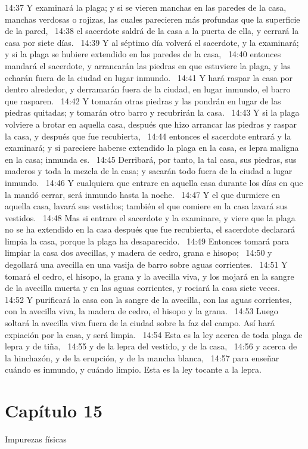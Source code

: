14:37 Y examinará la plaga; y si se vieren manchas en las paredes de la casa, manchas verdosas o rojizas, las cuales parecieren más profundas que la superficie de la pared,  
14:38 el sacerdote saldrá de la casa a la puerta de ella, y cerrará la casa por siete días.  
14:39 Y al séptimo día volverá el sacerdote, y la examinará; y si la plaga se hubiere extendido en las paredes de la casa,  
14:40 entonces mandará el sacerdote, y arrancarán las piedras en que estuviere la plaga, y las echarán fuera de la ciudad en lugar inmundo.  
14:41 Y hará raspar la casa por dentro alrededor, y derramarán fuera de la ciudad, en lugar inmundo, el barro que rasparen.  
14:42 Y tomarán otras piedras y las pondrán en lugar de las piedras quitadas; y tomarán otro barro y recubrirán la casa.  
14:43 Y si la plaga volviere a brotar en aquella casa, después que hizo arrancar las piedras y raspar la casa, y después que fue recubierta,  
14:44 entonces el sacerdote entrará y la examinará; y si pareciere haberse extendido la plaga en la casa, es lepra maligna en la casa; inmunda es.  
14:45 Derribará, por tanto, la tal casa, sus piedras, sus maderos y toda la mezcla de la casa; y sacarán todo fuera de la ciudad a lugar inmundo.  
14:46 Y cualquiera que entrare en aquella casa durante los días en que la mandó cerrar, será inmundo hasta la noche.  
14:47 Y el que durmiere en aquella casa, lavará sus vestidos; también el que comiere en la casa lavará sus vestidos.  
14:48 Mas si entrare el sacerdote y la examinare, y viere que la plaga no se ha extendido en la casa después que fue recubierta, el sacerdote declarará limpia la casa, porque la plaga ha desaparecido.  
14:49 Entonces tomará para limpiar la casa dos avecillas, y madera de cedro, grana e hisopo;  
14:50 y degollará una avecilla en una vasija de barro sobre aguas corrientes.  
14:51 Y tomará el cedro, el hisopo, la grana y la avecilla viva, y los mojará en la sangre de la avecilla muerta y en las aguas corrientes, y rociará la casa siete veces.  
14:52 Y purificará la casa con la sangre de la avecilla, con las aguas corrientes, con la avecilla viva, la madera de cedro, el hisopo y la grana.  
14:53 Luego soltará la avecilla viva fuera de la ciudad sobre la faz del campo. Así hará expiación por la casa, y será limpia.  
14:54 Esta es la ley acerca de toda plaga de lepra y de tiña,  
14:55 y de la lepra del vestido, y de la casa,  
14:56 y acerca de la hinchazón, y de la erupción, y de la mancha blanca,  
14:57 para enseñar cuándo es inmundo, y cuándo limpio. Esta es la ley tocante a la lepra.  
\section*{Capítulo 15}
Impurezas físicas  

